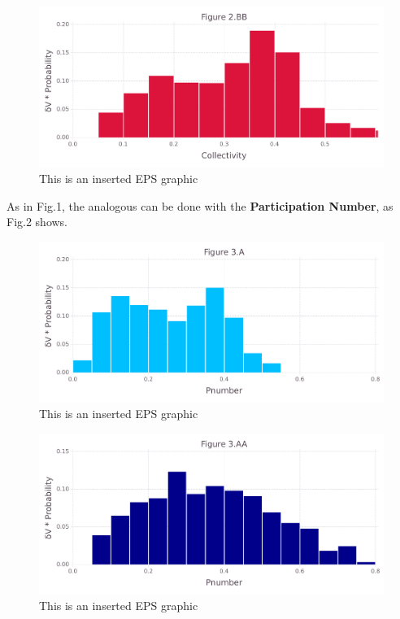 \documentclass[10pt,letterpaper]{article}
\begin{document}
\begin{figure}[ht]
\begin{center}
\includegraphics[scale=0.5]{1hvr_apo/2bbfigure_very_hi-precision.pdf}
\caption{This is an inserted EPS graphic}
\label{fig6}
\end{center}
\end{figure}


\clearpage
As in Fig.1, the analogous can be done with the \textbf{Participation Number}, as Fig.2 shows.

\begin{figure}[ht]
\begin{center}
\includegraphics[scale=0.5]{1hvr_apo/3afigure_very_hi-precision.pdf}
\caption{This is an inserted EPS graphic}
\label{fig7}
\end{center}
\end{figure}

\begin{figure}[ht]
\begin{center}
\includegraphics[scale=0.5]{1hvr_apo/3aafigure_very_hi-precision.pdf}
\caption{This is an inserted EPS graphic}
\label{fig8}
\end{center}
\end{figure}
\end{document}
